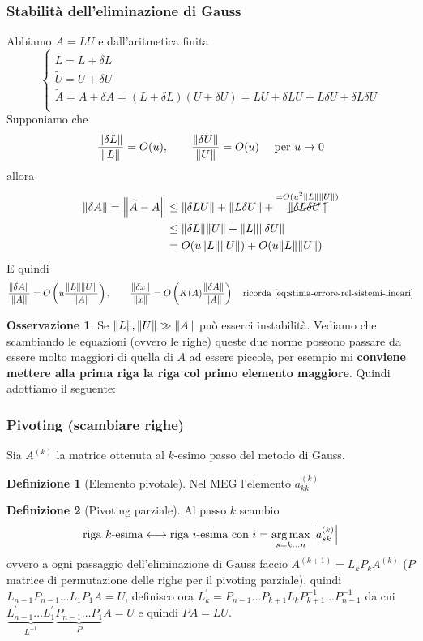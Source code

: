 \documentclass[a4paper,10pt]{article}
\theoremstyle{definition}
\DeclareMathOperator*{\argmax}{arg\,max}
\theoremstyle{indentdefinition}
\newtheorem{defn}{Definizione}[section]
\theoremstyle{indenttheorem}
\theoremstyle{myremark}
\newtheorem*{rem*}{Osservazione}
\theoremstyle{indentgeneral}
\theoremstyle{plain}
\theoremstyle{plain}
\begin{document}
\subsubsection{Stabilità dell'eliminazione di Gauss}
Abbiamo $A=LU$ e dall'aritmetica finita
$$\begin{cases}
    \widetilde{L}=L+\delta L \\
    \widetilde{U}=U+\delta U \\
    \widetilde{A}=A+\delta A=(L+\delta L)(U+\delta U)=LU+\delta LU+L\delta U+\delta L\delta U \\
\end{cases}$$
Supponiamo che
$$\frac{\norm{\delta L}}{\norm{L}}=O(u),\quad\quad \frac{\norm{\delta U}}{\norm{U}}=O(u)\quad \text{ per }u\to0$$
allora
\begin{align*}
    \norm{\delta A}=\norm{\widetilde{A}-A}&\le \norm{\delta LU}+\norm{L\delta U}+\overset{=O(u^2\norm{L}\norm{U})}{\cancel{\norm{\delta L\delta U}}} \\
    &\le \norm{\delta L}\norm{U}+\norm{L}\norm{\delta U} \\
    &=O(u\norm{L}\norm{U})+O(u\norm{L}\norm{U})
\end{align*}
E quindi
$$\frac{\norm{\delta A}}{\norm{A}}=O\left(u\frac{\norm{L}\norm{U}}{\norm{A}}\right),\quad\quad \frac{\norm{\delta x}}{\norm{x}}=O\left(K(A)\frac{\norm{\delta A}}{\norm{A}}\right) \quad\text{ricorda \ref{eq:stima-errore-rel-sistemi-lineari}}$$

\begin{rem*}
    Se $\norm{L},\norm{U}\gg \norm{A}$ può esserci instabilità. Vediamo che scambiando le equazioni (ovvero le righe) queste due norme possono passare da essere molto maggiori di quella di $A$ ad essere piccole, per esempio mi \textbf{conviene mettere alla prima riga la riga col primo elemento maggiore}. Quindi adottiamo il seguente:
\end{rem*}

\subsubsection{Pivoting (scambiare righe)}
Sia $A^{(k)}$ la matrice ottenuta al $k$-esimo passo del metodo di Gauss. 
\begin{defn}[Elemento pivotale] Nel MEG l'elemento $a_{kk}^{(k)}$
    
\end{defn}
\begin{defn}[Pivoting parziale]
    Al passo $k$ scambio
    $$\text{riga $k$-esima}\longleftrightarrow \text{riga $i$-esima con }i=\argmax_{s=k\dots n}\abs{a_{sk}^{(k)}}$$
    ovvero a ogni passaggio dell'eliminazione di Gauss faccio $A^{(k+1)}=L_{k}P_{k}A^{\left(k\right)}$
($P$ matrice di permutazione delle righe per il pivoting parziale),
quindi $L_{n-1}P_{n-1}\ldots L_{1}P_{1}A=U$, definisco ora $L_{k}^{\prime}=P_{n-1}\ldots P_{k+1}L_{k}P_{k+1}^{-1}\ldots P_{n-1}^{-1}$
da cui $\underset{L^{-1}}{\underbrace{L_{n-1}^{\prime}\ldots L_{1}^{\prime}}}\underset{P}{\underbrace{P_{n-1}\ldots P_{1}}}A=U$
e quindi $PA=LU$.

\end{defn}
\end{document}
